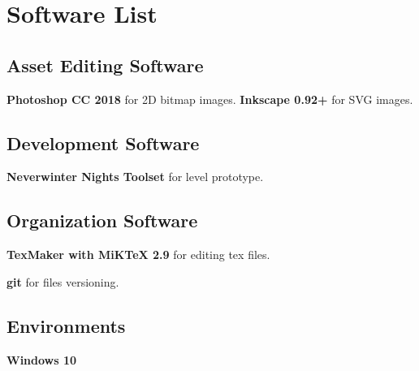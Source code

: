 \section{Software List}

\subsection{Asset Editing Software}
\textbf{Photoshop CC 2018} for 2D bitmap images.
\textbf{Inkscape 0.92+} for SVG images.

\subsection{Development Software}
\textbf{Neverwinter Nights Toolset} for level prototype.

\subsection{Organization Software}
\textbf{TexMaker with MiKTeX 2.9} for editing tex files.

\textbf{git} for files versioning.

\subsection{Environments}
\textbf{Windows 10}
